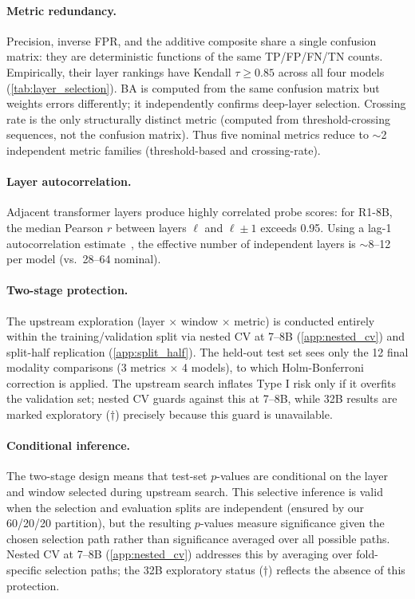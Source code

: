 \paragraph{Metric redundancy.} Precision, inverse FPR, and the additive composite share a single confusion matrix: they are deterministic functions of the same TP/FP/FN/TN counts. Empirically, their layer rankings have Kendall $\tau \geq 0.85$ across all four models (\cref{tab:layer_selection}). BA is computed from the same confusion matrix but weights errors differently; it independently confirms deep-layer selection. Crossing rate is the only structurally distinct metric (computed from threshold-crossing sequences, not the confusion matrix). Thus five nominal metrics reduce to ${\sim}$2 independent metric families (threshold-based and crossing-rate).

\paragraph{Layer autocorrelation.} Adjacent transformer layers produce highly correlated probe scores: for R1-8B, the median Pearson $r$ between layers $\ell$ and $\ell{\pm}1$ exceeds 0.95. Using a lag-1 autocorrelation estimate~\citep{efron1993bootstrap}, the effective number of independent layers is ${\sim}$8--12 per model (vs.\ 28--64 nominal).

\paragraph{Two-stage protection.} The upstream exploration (layer $\times$ window $\times$ metric) is conducted entirely within the training/validation split via nested CV at 7--8B (\cref{app:nested_cv}) and split-half replication (\cref{app:split_half}). The held-out test set sees only the 12 final modality comparisons (3 metrics $\times$ 4 models), to which Holm-Bonferroni correction is applied. The upstream search inflates Type I risk only if it overfits the validation set; nested CV guards against this at 7--8B, while 32B results are marked exploratory ($\dagger$) precisely because this guard is unavailable.

\paragraph{Conditional inference.} The two-stage design means that test-set $p$-values are conditional on the layer and window selected during upstream search. This selective inference is valid when the selection and evaluation splits are independent (ensured by our 60/20/20 partition), but the resulting $p$-values measure significance given the chosen selection path rather than significance averaged over all possible paths. Nested CV at 7--8B (\cref{app:nested_cv}) addresses this by averaging over fold-specific selection paths; the 32B exploratory status ($\dagger$) reflects the absence of this protection.

